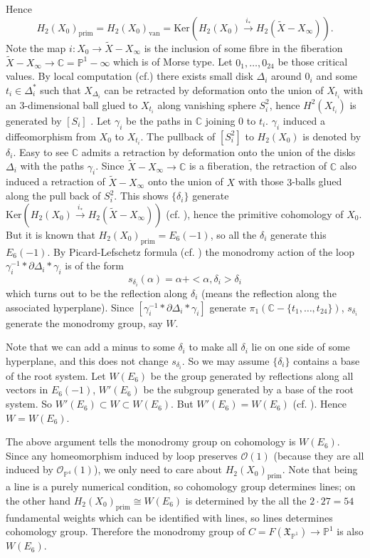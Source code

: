 \documentclass{article}
\begin{document}
Hence
$$H_{2}(X_0)_\text{prim}=H_{2}(X_0)_\text{van}=\text{Ker}(H_{2}(X_0) \xrightarrow{i_*}  H_{2}(\tilde X-X_\infty)) \text{.}$$
Note the map $i\colon X_0 \to \tilde X-X_\infty$ is the inclusion of some fibre in the fiberation $\tilde X -X_\infty \to \mathbb C =\mathbb P^1-\infty$ which is of Morse type. Let $0_1, \ldots, 0_{24}$ be those critical values. By local computation (cf.\cite[Thm.2.16]{V}) there exists small disk $\Delta_i$ around $0_i$ and some $t_i\in \Delta_i^*$ such that $X_{\Delta_i}$ can be retracted by deformation onto the union of $X_{t_i}$ with an $3$-dimensional ball glued to $X_{t_i}$ along vanishing sphere $S^2_i$, hence $H^2(X_{t_i})$ is generated by $[S_i]$ . Let $\gamma_i$ be the paths in $\mathbb C$ joining $0$ to $t_i$. $\gamma_i$ induced a diffeomorphism from $X_0$ to $X_{t_i}$. The pullback of $[S^2_i]$ to $H_2(X_0)$ is denoted by $\delta_i$. Easy to see $\mathbb C$ admits a retraction by deformation onto the union of the disks $\Delta_i$ with the paths $\gamma_i$. Since $\tilde X -X_\infty \to \mathbb C$ is a fiberation, the retraction of $\mathbb C$ also induced a retraction of $\tilde X- X_\infty$ onto the union of $X$ with those $3$-balls glued along the pull back of $S^2_i$. This shows $\{\delta_i\}$ generate $\text{Ker}(H_{2}(X_0) \xrightarrow{i_*}  H_{2}(\tilde X-X_\infty))$ (cf. \cite[Cor.2.20]{V} ), hence the primitive cohomology of $X_0$. But it is known that $H_{2}(X_0)_\text{prim}=E_6(-1)$, so all the $\delta_i$ generate this $E_6(-1)$. By Picard-Lefschetz formula (cf. \cite[Thm.3.16]{V}) the monodromy action of the loop $\gamma_i^{-1} *\partial \Delta_i *\gamma_i$ is of the form
$$s_{\delta_i}(\alpha)=\alpha+<\alpha,\delta_i>\delta_i$$
which turns out to be the reflection along $\delta_i$ (means the reflection along the associated hyperplane). Since $[\gamma_i^{-1} *\partial \Delta_i *\gamma_i]$ generate $\pi_1(\mathbb C-\{t_1,\ldots,t_{24}\})$, $s_{\delta_i}$ generate the monodromy group, say $W$.

Note that we can add a minus to some $\delta_i$ to make all $\delta_i$ lie on one side of some hyperplane, and this does not change $s_{\delta_i}$. So we may assume $\{\delta_i\}$ contains a base of the root system. Let $W(E_6)$ be the group generated by reflections along all vectors in $E_6(-1)$, $W'(E_6)$ be the subgroup generated by a base of the root system. So $W'(E_6)\subset W \subset W(E_6)$. But $W'(E_6)=W(E_6)$ (cf. \cite[Sec.10.3]{Hum}). Hence $W=W(E_6)$.


The above argument tells the monodromy group on cohomology is $W(E_6)$. Since any homeomorphism induced by loop preserves $\mathcal O(1)$ (because they are all induced by $\mathcal O_{\mathbb P^4}(1)$), we only need to care about $H_2(X_0)_\text{prim}$. Note that being a line is a purely numerical condition, so cohomology group determines lines; on the other hand $H_2(X_0)_\text{prim}\cong W(E_6)$ is determined by the all the $2\cdot 27=54$ fundamental weights which can be identified with lines, so lines determines cohomology group. Therefore the monodromy group of $C=F(\mathfrak X_{\mathbb P^1})\to \mathbb P^1$ is also $W(E_6)$.
\end{document}
